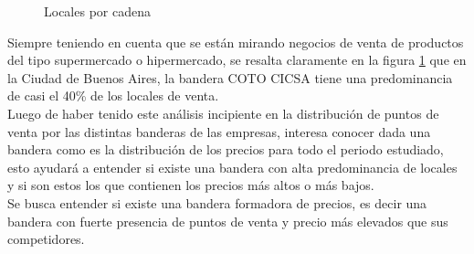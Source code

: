 \begin{figure}[h]
\centering
{}%
\caption{Locales por cadena}
\label{Locales_x_cadena}
\end{figure}





Siempre teniendo en cuenta que se están mirando negocios de venta de productos del tipo supermercado o hipermercado, se resalta claramente en la figura \ref{Locales_x_cadena} que en la Ciudad de Buenos Aires, la bandera COTO CICSA tiene una predominancia de casi el 40\% de los locales de venta.\\

Luego de haber tenido este análisis incipiente en la distribución de puntos de venta por las distintas banderas de las empresas, interesa conocer dada una bandera como es la distribución de los precios para todo el periodo estudiado, esto ayudará a entender si existe una bandera con alta predominancia de locales y si son estos los que contienen los precios más altos o más bajos.\\
Se busca entender si existe una bandera formadora de precios, es decir una bandera con fuerte presencia de puntos de venta y precio más elevados que sus competidores.\\




